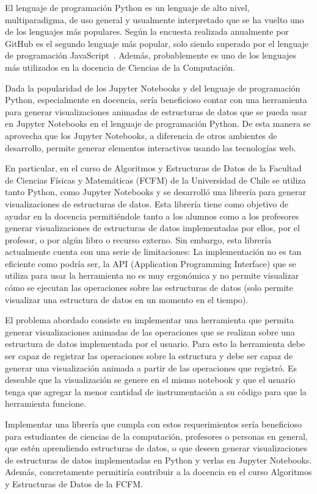 El lenguaje de programación Python es un lenguaje de alto nivel, multiparadigma, de uso general y usualmente interpretado que se ha vuelto uno de los lenguajes más populares. Según la encuesta realizada anualmente por GitHub es el segundo lenguaje más popular, solo siendo superado por el lenguaje de programación JavaScript~\cite{encuesta-github}. Además, probablemente es uno de los lenguajes más utilizados en la docencia de Ciencias de la Computación.

Dada la popularidad de los Jupyter Notebooks y del lenguaje de programación Python, especialmente en docencia, sería beneficioso contar con una herramienta para generar visualizaciones animadas de estructuras de datos que se pueda usar en Jupyter Notebooks en el lenguaje de programación Python. De esta manera se aprovecha que los Jupyter Notebooks, a diferencia de otros ambientes de desarrollo, permite generar elementos interactivos usando las tecnologías web.

En particular, en el curso de Algoritmos y Estructuras de Datos de la Facultad de Ciencias Físicas y Matemáticas (FCFM) de la Universidad de Chile se utiliza tanto Python, como Jupyter Notebooks y se desarrolló una librería para generar visualizaciones de estructuras de datos. Esta librería tiene como objetivo de ayudar en la docencia permitiéndole tanto a los alumnos como a los profesores generar visualizaciones de estructuras de datos implementadas por ellos, por el profesor, o por algún libro o recurso externo. Sin embargo, esta librería actualmente cuenta con una serie de limitaciones: La implementación no es tan eficiente como podría ser, la API (Application Programming Interface) que se utiliza para usar la herramienta no es muy ergonómica y no permite visualizar cómo se ejecutan las operaciones sobre las estructuras de datos (solo permite visualizar una estructura de datos en un momento en el tiempo).

El problema abordado consiste en implementar una herramienta que permita generar visualizaciones animadas de las operaciones que se realizan sobre una estructura de datos implementada por el usuario. Para esto la herramienta debe ser capaz de registrar las operaciones sobre la estructura y debe ser capaz de generar una visualización animada a partir de las operaciones que registró. Es deseable que la visualización se genere en el mismo notebook y que el usuario tenga que agregar la menor cantidad de instrumentación a su código para que la herramienta funcione.

Implementar una librería que cumpla con estos requerimientos sería beneficioso para estudiantes de ciencias de la computación, profesores o personas en general, que estén aprendiendo estructuras de datos, o que deseen generar visualizaciones de estructuras de datos implementadas en Python y verlas en Jupyter Notebooks. Además, concretamente permitiría contribuir a la docencia en el curso Algoritmos y Estructuras de Datos de la FCFM.
